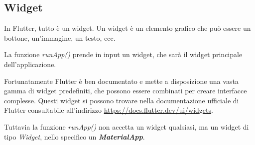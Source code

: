 \documentclass[12pt]{article}
\begin{document}
\subsection{Widget}
In Flutter, tutto è un widget. Un widget è un elemento grafico
che può essere un bottone, un'immagine, un testo, ecc.

La funzione \textit{runApp()} prende in input un widget, che sarà
il widget principale dell'applicazione.

Fortunatamente Flutter è ben documentato e mette a disposizione
una vasta gamma di widget predefiniti, che possono essere combinati
per creare interfacce complesse. Questi widget si possono
trovare nella documentazione ufficiale di Flutter consultabile
all'indirizzo \url{https://docs.flutter.dev/ui/widgets}.

Tuttavia la funzione \textit{runApp()} non accetta un widget qualsiasi,
ma un widget di tipo \textit{Widget}, nello specifico un \textit{\textbf{MaterialApp}}.
\end{document}
